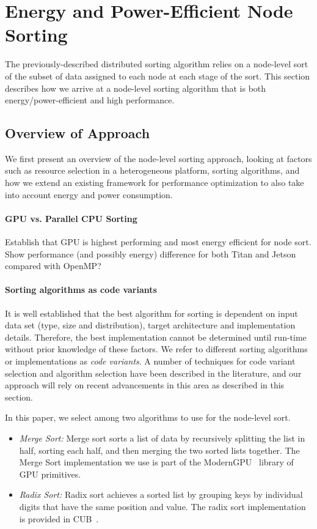 \section{Energy and Power-Efficient Node Sorting}
The previously-described distributed sorting algorithm relies
on a node-level sort of the subset of data assigned to each node at 
each stage of the sort.  This section describes how we arrive 
at a node-level sorting algorithm that is both energy/power-efficient and
high performance.  

\subsection{Overview of Approach}
We first present an overview of the node-level sorting approach, 
looking at factors such as resource selection in a heterogeneous platform, 
sorting algorithms, and how we extend an existing framework for performance
optimization to also take into account energy and power consumption.

\paragraph{GPU vs. Parallel CPU Sorting}
{\color{red}Establish that GPU is highest performing and most energy efficient for node sort.
Show performance (and possibly energy) 
difference for both Titan and Jetson compared with OpenMP?}  

\paragraph{Sorting algorithms as code variants}
It is well established that the best algorithm for sorting
is dependent on input data set (type, size and distribution), target 
architecture and implementation details. Therefore, the best
implementation cannot be determined until
run-time without prior knowledge of these factors.
We refer to different sorting algorithms or implementations
as \emph{code variants}.  
A number of techniques for code variant selection and algorithm
selection have been described in the literature, and our approach
will rely on recent advancements in this area as described in this section.
 
In this paper, we select among two algorithms to use for
the node-level sort.  
\begin{itemize}
\item \emph{Merge Sort:}
Merge sort sorts a list of data by 
recursively splitting the list in half, sorting each half,
and then merging the two sorted lists together.
The Merge Sort implementation we use is
part of the ModernGPU~\cite{modernGPU} library of GPU
primitives.  
\item \emph{Radix Sort:}
Radix sort achieves a sorted list by grouping keys by individual digits  
that have the same position and value.
The radix sort implementation is provided in CUB~\cite{cub}. 
\end{itemize}

